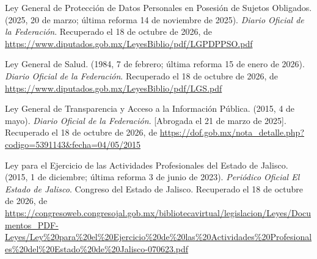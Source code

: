 \documentclass[12pt, a4paper]{article}
\begin{document}
\begin{list}{}{\setlength{\leftmargin}{1.27cm}\setlength{\itemindent}{-1.27cm}%
  \setlength{\labelwidth}{0pt}\setlength{\labelsep}{0pt}\setlength{\itemsep}{6pt}}
\item Ley General de Protección de Datos Personales en Posesión de
  Sujetos Obligados. (2025, 20 de marzo; última reforma 14 de
  noviembre de 2025). \textit{Diario Oficial de la Federación}. Recuperado el 18 de octubre de 2026, de \url{https://www.diputados.gob.mx/LeyesBiblio/pdf/LGPDPPSO.pdf}
 

\item Ley General de Salud. (1984, 7 de febrero; última reforma
  15 de enero de 2026). \textit{Diario Oficial de la Federación}. Recuperado el 18 de octubre de 2026, de \url{https://www.diputados.gob.mx/LeyesBiblio/pdf/LGS.pdf}

\item Ley General de Transparencia y Acceso a la Información
  Pública. (2015, 4 de mayo). \textit{Diario Oficial de la
   Federación}. [Abrogada el 21 de marzo de 2025].
  Recuperado el 18 de octubre de 2026, de \url{https://dof.gob.mx/nota_detalle.php?codigo=5391143&fecha=04/05/2015}
 
\item Ley para el Ejercicio de las Actividades Profesionales del
  Estado de Jalisco. (2015, 1 de diciembre; última reforma 3 de
  junio de 2023). \textit{Periódico Oficial El Estado de Jalisco}.
  Congreso del Estado de Jalisco. Recuperado el 18 de octubre de 2026, de \url{https://congresoweb.congresojal.gob.mx/bibliotecavirtual/legislacion/Leyes/Documentos_PDF-Leyes/Ley%20para%20el%20Ejercicio%20de%20las%20Actividades%20Profesionales%20del%20Estado%20de%20Jalisco-070623.pdf}

  

\end{list}
\end{document}
